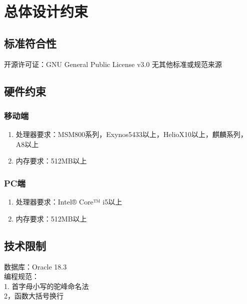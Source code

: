 \chapter{总体设计约束}
\section{标准符合性}
开源许可证：GNU General Public License v3.0
无其他标准或规范来源
\section{硬件约束}
\subsection{移动端}
	\begin{enumerate}
		\item 处理器要求：MSM800系列，Exynos5433以上，HelioX10以上，麒麟系列，A8以上
		\item 内存要求：512MB以上
	\end{enumerate}
\subsection{PC端}
	\begin{enumerate}
		\item 处理器要求：Intel® Core™ i5以上
		\item 内存要求：512MB以上 
	\end{enumerate}
\section{技术限制}
\noindent
数据库：Oracle 18.3 \\
编程规范：\\
    1. 首字母小写的驼峰命名法\\
    2，函数大括号换行\\